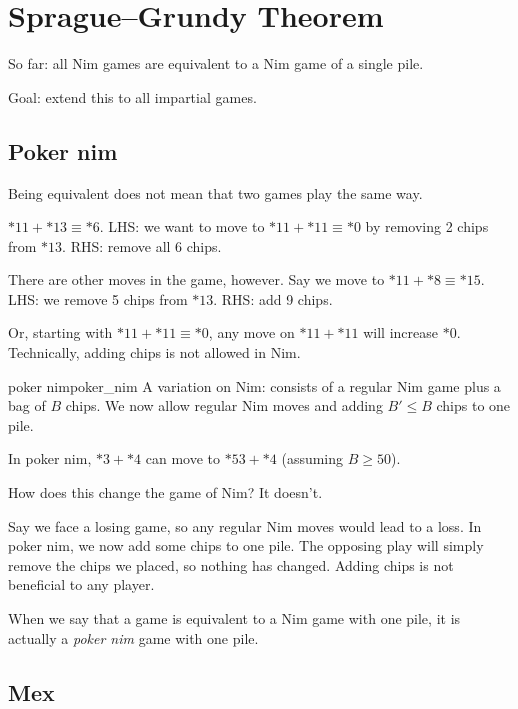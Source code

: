\documentclass[12pt,letterpaper]{report}
\begin{document}
\section{Sprague--Grundy Theorem}

So far: all Nim games are equivalent to a Nim game of a single pile.

Goal: extend this to all impartial games.

\subsection{Poker nim}

Being equivalent does not mean that two games play the same way.

\begin{ex}
  $*11 + *13 \equiv *6$.
  LHS: we want to move to $*11 + *11 \equiv *0$ by removing 2 chips from $*13$.
  RHS: remove all 6 chips.

  There are other moves in the game, however.
  Say we move to $*11 + *8 \equiv *15$.
  LHS: we remove 5 chips from $*13$.
  RHS: add 9 chips.

  Or, starting with $*11 + *11 \equiv *0$, any move on $*11 + *11$ will increase $*0$.
  Technically, adding chips is not allowed in Nim.
\end{ex}

\begin{defn}{poker nim}{poker_nim}
  A variation on Nim:  consists of a regular Nim game plus a bag of $B$ chips.
  We now allow regular Nim moves and adding $B' \leq B$ chips to one pile.
\end{defn}

\begin{ex}
  In poker nim, $*3 + *4$ can move to $*53 + *4$ (assuming $B \geq 50$).
\end{ex}

How does this change the game of Nim?
It doesn't.

Say we face a losing game, so any regular Nim moves would lead to a loss.
In poker nim, we now add some chips to one pile.
The opposing play will simply remove the chips we placed, so nothing has changed.
Adding chips is not beneficial to any player.

When we say that a game is equivalent to a Nim game with one pile, it is actually a \emph{poker nim}
game with one pile.

\pagebreak
\subsection{Mex}
\end{document}

